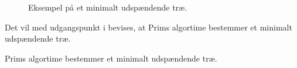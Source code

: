 \begin{figure}[!h]
  \centering
  
  \caption{Eksempel på et minimalt udspændende træ.}
  \label{eks_prim}
\end{figure}

Det vil med udgangspunkt i \citep{prim} bevises, at Prims algortime bestemmer et minimalt udspændende træ.

\begin{thm}
Prims algortime bestemmer et minimalt udspændende træ. 
\label{set_prim}
\end{thm}






